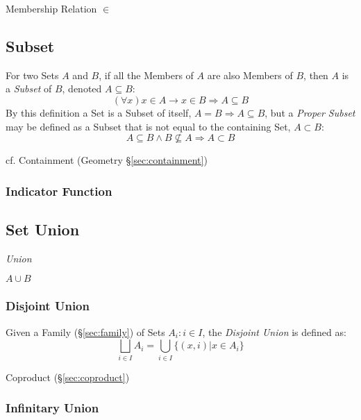 Membership Relation $\in$



\subsection{Subset}\label{sec:subset}

For two Sets $A$ and $B$, if all the Members of $A$ are also Members
of $B$, then $A$ is a \emph{Subset} of $B$, denoted $A \subseteq B$:
\[
  (\forall x) x \in A \rightarrow x \in B \Rightarrow A \subseteq B
\]
By this definition a Set is a Subset of itself, $A = B \Rightarrow A
\subseteq B$, but a \emph{Proper Subset} may be defined as a Subset
that is not equal to the containing Set, $A \subset B$:
\[
  A \subseteq B \wedge B \nsubseteq A \Rightarrow A \subset B
\]

\fist cf. Containment (Geometry \S\ref{sec:containment})



\subsubsection{Indicator Function}\label{sec:indicator_function}



\subsection{Set Union}\label{sec:set_union}

\emph{Union}

$A \cup B$



\subsubsection{Disjoint Union}\label{sec:disjoint_union}

Given a Family (\S\ref{sec:family}) of Sets ${A_i : i \in I}$,
the \emph{Disjoint Union} is defined as:
\[
  \bigsqcup_{i \in I} A_i = \bigcup_{i \in I} \{(x,i) | x \in A_i \}
\]

Coproduct (\S\ref{sec:coproduct})



\subsubsection{Infinitary Union}\label{sec:infinitary_union}

